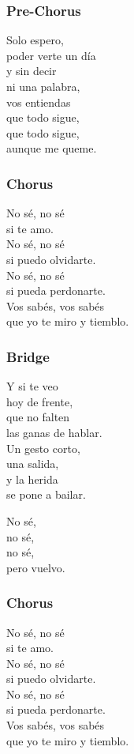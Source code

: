 \documentclass[]{article}
\begin{document}
\subsubsection{Pre-Chorus}\label{pre-chorus-33}

Solo espero,\\
poder verte un día\\
y sin decir\\
ni una palabra,\\
vos entiendas\\
que todo sigue,\\
que todo sigue,\\
aunque me queme.

\subsubsection{Chorus}\label{chorus-50}

No sé, no sé\\
si te amo.\\
No sé, no sé\\
si puedo olvidarte.\\
No sé, no sé\\
si pueda perdonarte.\\
Vos sabés, vos sabés\\
que yo te miro y tiemblo.

\subsubsection{Bridge}\label{bridge-14}

Y si te veo\\
hoy de frente,\\
que no falten\\
las ganas de hablar.\\
Un gesto corto,\\
una salida,\\
y la herida\\
se pone a bailar.

No sé,\\
no sé,\\
no sé,\\
pero vuelvo.

\subsubsection{Chorus}\label{chorus-51}

No sé, no sé\\
si te amo.\\
No sé, no sé\\
si puedo olvidarte.\\
No sé, no sé\\
si pueda perdonarte.\\
Vos sabés, vos sabés\\
que yo te miro y tiemblo.
\end{document}

